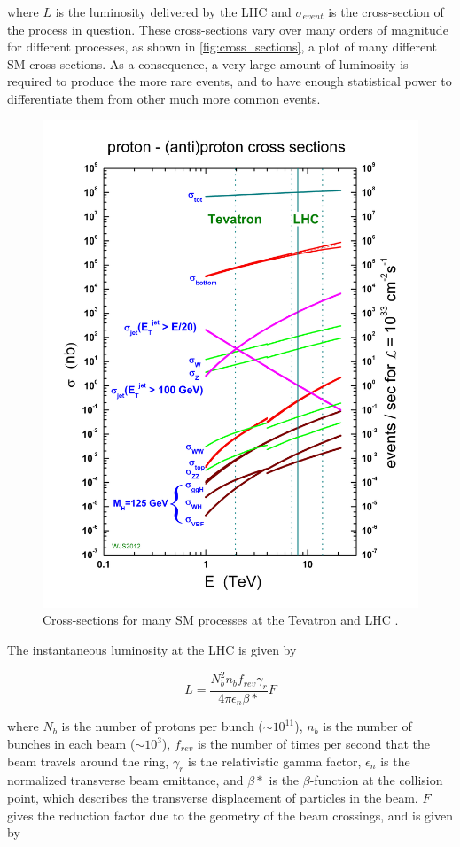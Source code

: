 where $L$ is the luminosity delivered by the \ac{LHC} and $\sigma_{event}$ is the cross-section of the process in question. These cross-sections vary over many orders of magnitude for different processes, as shown in \autoref{fig:cross_sections}, a plot of many different \ac{SM} cross-sections. As a consequence, a very large amount of luminosity is required to produce the more rare events, and to have enough statistical power to differentiate them from other much more common events.   

\begin{centering}
\begin{figure}[!hbt]
\myfloatalign
\includegraphics[width=.60\linewidth]{figures/lhc/crosssections2013.jpg}
\caption{Cross-sections for many \ac{SM} processes at the Tevatron and \ac{LHC} \cite{crosssections}.}
\label{fig:cross_sections}
\end{figure}
\end{centering}

The instantaneous luminosity at the \ac{LHC} is given by

\begin{equation}
L = \frac{ N^2_b n_b f_{rev} \gamma_r }{ 4\pi \epsilon_n \beta* } F
\end{equation}

where $N_b$ is the number of protons per bunch ($\sim10^{11}$), $n_b$ is the number of bunches in each beam ($\sim10^3$), $f_{rev}$ is the number of times per second that the beam travels around the ring, $\gamma_r$ is the relativistic gamma factor, $\epsilon_n$ is the normalized transverse beam emittance, and $\beta*$ is the $\beta$-function at the collision point, which describes the transverse displacement of particles in the beam. $F$ gives the reduction factor due to the geometry of the beam crossings, and is given by

